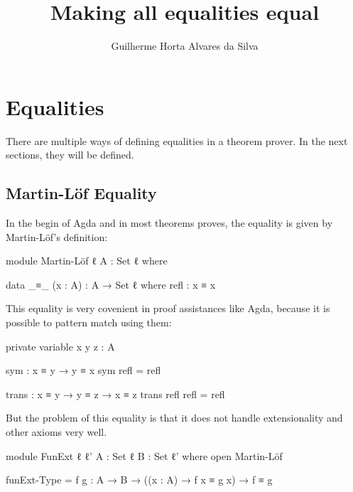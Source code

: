 \documentclass{article}
\author{Guilherme Horta Alvares da Silva}
\title{Making all equalities equal}
\begin{document}


\maketitle

\begin{abstract}

\end{abstract}


\section{Equalities}

There are multiple ways of defining equalities in a theorem prover.
In the next sections, they will be defined.

\subsection{Martin-Löf Equality}

In the begin of Agda and in most theorems proves, the equality is given by Martin-Löf's definition:

\begin{code}
module Martin-Löf {ℓ} {A : Set ℓ} where

  data _≡_ (x : A) : A → Set ℓ where
    refl : x ≡ x
\end{code}

This equality is very covenient in proof assistances like Agda, because it is possible to pattern match using them:

\begin{code}
  private variable
    x y z : A

  sym  : x ≡ y → y ≡ x
  sym refl = refl

  trans : x ≡ y → y ≡ z → x ≡ z
  trans refl refl = refl
\end{code}

But the problem of this equality is that it does not handle extensionality and other axioms very well.

\begin{code}
module FunExt {ℓ ℓ'} {A : Set ℓ} {B : Set ℓ'} where
  open Martin-Löf

  funExt-Type = {f g : A → B}
    → ((x : A) → f x ≡ g x) → f ≡ g
\end{code}
\end{document}
